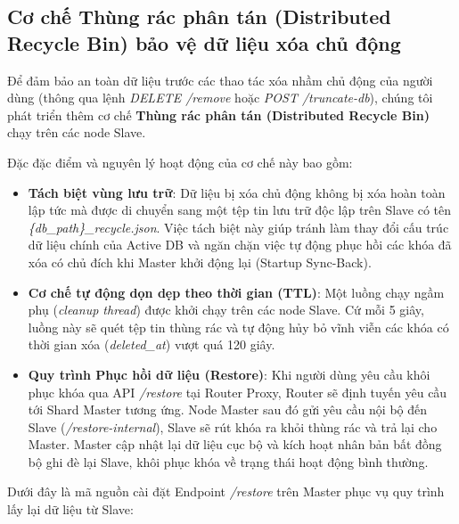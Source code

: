 \documentclass[12pt,a4paper]{report}
\begin{document}
\subsection{Cơ chế Thùng rác phân tán (Distributed Recycle Bin) bảo vệ dữ liệu xóa chủ động}
Để đảm bảo an toàn dữ liệu trước các thao tác xóa nhầm chủ động của người dùng (thông qua lệnh \textit{DELETE /remove} hoặc \textit{POST /truncate-db}), chúng tôi phát triển thêm cơ chế \textbf{Thùng rác phân tán (Distributed Recycle Bin)} chạy trên các node Slave. 

Đặc đặc điểm và nguyên lý hoạt động của cơ chế này bao gồm:
\begin{itemize}
    \item \textbf{Tách biệt vùng lưu trữ}: Dữ liệu bị xóa chủ động không bị xóa hoàn toàn lập tức mà được di chuyển sang một tệp tin lưu trữ độc lập trên Slave có tên \textit{\{db\_path\}\_recycle.json}. Việc tách biệt này giúp tránh làm thay đổi cấu trúc dữ liệu chính của Active DB và ngăn chặn việc tự động phục hồi các khóa đã xóa có chủ đích khi Master khởi động lại (Startup Sync-Back).
    \item \textbf{Cơ chế tự động dọn dẹp theo thời gian (TTL)}: Một luồng chạy ngầm phụ (\textit{cleanup thread}) được khởi chạy trên các node Slave. Cứ mỗi 5 giây, luồng này sẽ quét tệp tin thùng rác và tự động hủy bỏ vĩnh viễn các khóa có thời gian xóa (\textit{deleted\_at}) vượt quá 120 giây.
    \item \textbf{Quy trình Phục hồi dữ liệu (Restore)}: Khi người dùng yêu cầu khôi phục khóa qua API \textit{/restore} tại Router Proxy, Router sẽ định tuyến yêu cầu tới Shard Master tương ứng. Node Master sau đó gửi yêu cầu nội bộ đến Slave (\textit{/restore-internal}), Slave sẽ rút khóa ra khỏi thùng rác và trả lại cho Master. Master cập nhật lại dữ liệu cục bộ và kích hoạt nhân bản bất đồng bộ ghi đè lại Slave, khôi phục khóa về trạng thái hoạt động bình thường.
\end{itemize}

Dưới đây là mã nguồn cài đặt Endpoint \textit{/restore} trên Master phục vụ quy trình lấy lại dữ liệu từ Slave:
\end{document}
